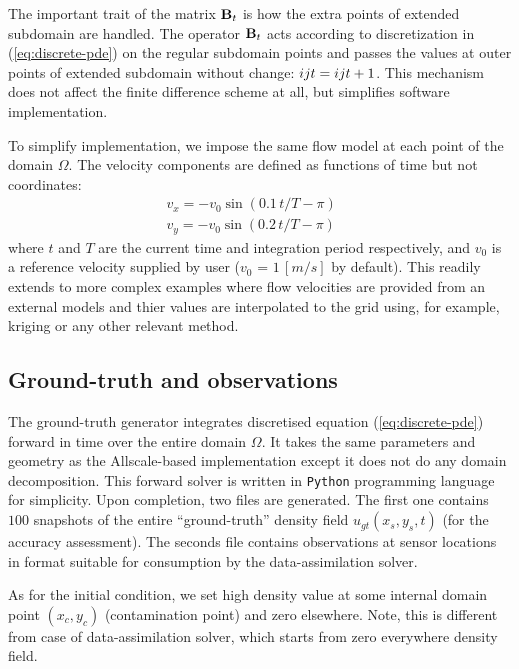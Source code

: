 \documentclass[conference,compsoc]{IEEEtran}
\begin{document}
The important trait of the matrix ${\bf B}_t$ is how the extra points of extended subdomain are handled. The operator ${\bf B}_t$ acts according to discretization in (\ref{eq:discrete-pde}) on the regular subdomain points and passes the values at outer points of extended subdomain without change: $\myu{i}{j}{t} = \myu{i}{j}{t+1}$. This mechanism does not affect the finite difference scheme at all, but simplifies software implementation.
\renewcommand{\myu}{}



To simplify implementation, we impose the same flow model at each point of the domain $\Omega$. The velocity components are defined as functions of time but not coordinates:
\begin{equation}
\begin{aligned}
& v_x = -v_0 \sin{(0.1 \, t / T - \pi)} \qquad \\
& v_y = -v_0 \sin{(0.2 \, t / T - \pi)}
\end{aligned}
\label{eq:flow}
\end{equation}
where $t$ and $T$ are the current time and integration period respectively, and $v_0$ is a reference velocity supplied by user ($v_0$ = $1\,[m/s]$ by default). 
This readily extends to more complex examples where flow velocities are provided from an external models and thier values are interpolated to the grid using, for example, kriging or any other relevant method.

\subsection{Ground-truth and observations}
\label{subsec:obsgen}
The ground-truth generator integrates discretised equation (\ref{eq:discrete-pde}) forward in time over the entire domain $\Omega$. It takes the same parameters and geometry as the Allscale-based implementation except it does not do any domain decomposition. This forward solver is written in \texttt{Python} programming language for simplicity. Upon completion, two files are generated. The first one contains $100$ snapshots of the entire ``ground-truth'' density field $u_{gt}(x_s,y_s,t)$ (for the accuracy assessment). The seconds file contains observations at sensor locations in format suitable for consumption by the data-assimilation solver. 

As for the initial condition, we set high density value at some internal domain point $(x_c,y_c)$ (contamination point) and zero elsewhere. Note, this is different from case of data-assimilation solver, which starts from zero everywhere density field.
\end{document}

